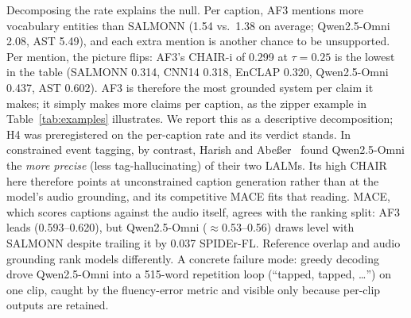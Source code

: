 \documentclass[conference]{IEEEtran}
\begin{document}
Decomposing the rate explains the null. Per caption, AF3 mentions more
vocabulary entities than SALMONN (1.54 vs.\ 1.38 on average; Qwen2.5-Omni
2.08, AST 5.49), and each extra mention is another chance to be unsupported.
Per mention, the picture flips: AF3's CHAIR-i of 0.299 at $\tau{=}0.25$ is
the lowest in the table (SALMONN 0.314, CNN14 0.318, EnCLAP 0.320,
Qwen2.5-Omni 0.437, AST 0.602). AF3 is therefore the most grounded system per
claim it makes; it simply makes more claims per caption, as the zipper example
in Table~\ref{tab:examples} illustrates. We report this as a descriptive
decomposition; H4 was preregistered on the per-caption rate and its verdict
stands. In constrained event
tagging, by contrast, Harish and
Abe{\ss}er~\cite{harish2025dcase} found Qwen2.5-Omni the \emph{more precise}
(less tag-hallucinating) of their two LALMs. Its high
CHAIR here therefore points at unconstrained caption generation
rather than at the model's audio grounding, and its competitive
MACE fits that reading. MACE, which scores
captions against the audio itself, agrees with the ranking split: AF3 leads
(0.593--0.620), but Qwen2.5-Omni ($\approx$0.53--0.56) draws level with
SALMONN despite trailing it by 0.037 SPIDEr-FL. Reference overlap and audio
grounding rank models differently. A concrete failure mode: greedy decoding
drove Qwen2.5-Omni into a 515-word repetition loop (``tapped, tapped,
\dots'') on one clip, caught by the fluency-error metric and visible only
because per-clip outputs are retained.
\end{document}
